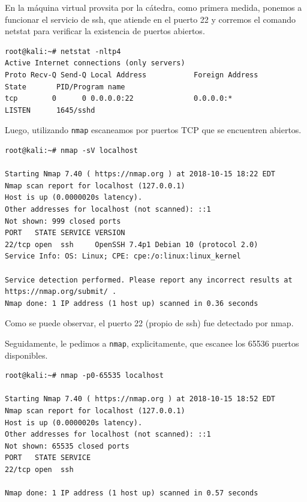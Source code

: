 En la máquina virtual provsita por la cátedra, como primera medida, ponemos a funcionar el servicio de ssh, que atiende en el puerto 22 y corremos el comando netstat para verificar la existencia de puertos abiertos.

\begingroup
    \fontsize{8pt}{10pt}\selectfont
\begin{lstlisting}[breaklines=true]
root@kali:~# netstat -nltp4
Active Internet connections (only servers)
Proto Recv-Q Send-Q Local Address           Foreign Address         State       PID/Program name    
tcp        0      0 0.0.0.0:22              0.0.0.0:*               LISTEN      1645/sshd           
\end{lstlisting}
\endgroup

Luego, utilizando \texttt{nmap} escaneamos por puertos TCP que se encuentren abiertos.

\begingroup
    \fontsize{9pt}{10pt}\selectfont
\begin{lstlisting}[breaklines=true]
root@kali:~# nmap -sV localhost

Starting Nmap 7.40 ( https://nmap.org ) at 2018-10-15 18:22 EDT
Nmap scan report for localhost (127.0.0.1)
Host is up (0.0000020s latency).
Other addresses for localhost (not scanned): ::1
Not shown: 999 closed ports
PORT   STATE SERVICE VERSION
22/tcp open  ssh     OpenSSH 7.4p1 Debian 10 (protocol 2.0)
Service Info: OS: Linux; CPE: cpe:/o:linux:linux_kernel

Service detection performed. Please report any incorrect results at https://nmap.org/submit/ .
Nmap done: 1 IP address (1 host up) scanned in 0.36 seconds
\end{lstlisting}
\endgroup

Como se puede observar, el puerto 22 (propio de ssh) fue detectado por nmap.

\pagebreak

Seguidamente, le pedimos a \texttt{nmap}, explicitamente, que escanee los 65536 puertos disponibles.

\begingroup
    \fontsize{9pt}{10pt}\selectfont
\begin{lstlisting}[breaklines=true]
root@kali:~# nmap -p0-65535 localhost

Starting Nmap 7.40 ( https://nmap.org ) at 2018-10-15 18:52 EDT
Nmap scan report for localhost (127.0.0.1)
Host is up (0.0000020s latency).
Other addresses for localhost (not scanned): ::1
Not shown: 65535 closed ports
PORT   STATE SERVICE
22/tcp open  ssh

Nmap done: 1 IP address (1 host up) scanned in 0.57 seconds
\end{lstlisting}
\endgroup

